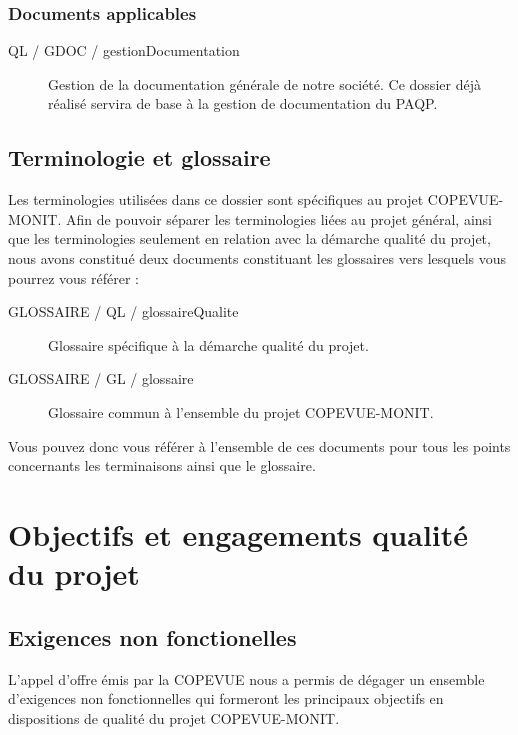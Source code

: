 \documentclass{mise_en_page}
\begin{document}
\subsubsection{Documents applicables}

\begin{description}
	\item[QL / GDOC / gestionDocumentation] Gestion de la documentation générale de notre société. Ce dossier déjà réalisé servira de base à la gestion de documentation du PAQP.
\end{description}

\subsection{Terminologie et glossaire}

Les terminologies utilisées dans ce dossier sont spécifiques au projet COPEVUE-MONIT. Afin de pouvoir séparer les terminologies liées au projet général, ainsi que les terminologies seulement en relation avec la démarche qualité du projet, nous avons constitué deux documents constituant les glossaires vers lesquels vous pourrez vous référer :

\begin{description}
	\item[GLOSSAIRE / QL / glossaireQualite ] Glossaire spécifique à la démarche qualité du projet.
	\item[GLOSSAIRE / GL / glossaire ] Glossaire commun à l'ensemble du projet COPEVUE-MONIT.
\end{description}

Vous pouvez donc vous référer à l'ensemble de ces documents pour tous les points concernants les terminaisons ainsi que le glossaire.

\section{Objectifs et engagements qualité du projet}

\subsection{Exigences non fonctionelles}

L'appel d'offre émis par la COPEVUE nous a permis de dégager un ensemble d'exigences non fonctionnelles qui formeront les principaux objectifs en dispositions de qualité du projet COPEVUE-MONIT.
\end{document}

